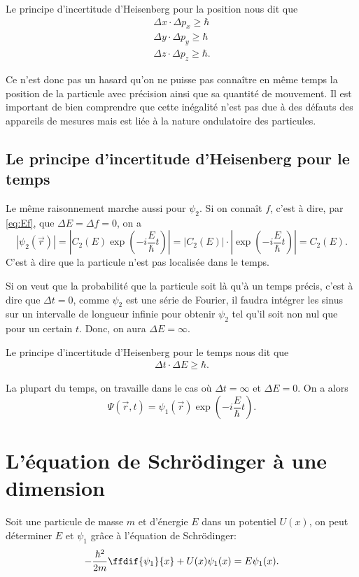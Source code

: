 Le principe d'incertitude d'Heisenberg pour la position nous dit que
\begin{align*}
  \Delta x \cdot \Delta p_x \geq \hbar\\
  \Delta y \cdot \Delta p_y \geq \hbar\\
  \Delta z \cdot \Delta p_z \geq \hbar.
\end{align*}

Ce n'est donc pas un hasard qu'on ne puisse pas connaître en même temps
la position de la particule avec précision ainsi que sa quantité de mouvement.
Il est important de bien comprendre que cette inégalité n'est pas due
à des défauts des appareils de mesures mais est liée à la nature
ondulatoire des particules.

\subsection{Le principe d'incertitude d'Heisenberg pour le temps}
Le même raisonnement marche aussi pour $\psi_2$.
Si on connaît $f$, c'est à dire, par \eqref{eq:Ef},
que $\Delta E = \Delta f = 0$, on a
\[ |\psi_2(\vec{r})|
= \left|C_2(E) \exp\left(-i\frac{E}{\hbar}t\right)\right|
= \left|C_2(E)\right|\cdot\left|\exp\left(-i\frac{E}{\hbar}t\right)\right|
= C_2(E). \]
C'est à dire que la particule n'est pas localisée dans le temps.

Si on veut que la probabilité que la particule soit là qu'à un temps précis,
c'est à dire que $\Delta t = 0$,
comme $\psi_2$ est une série de Fourier, il faudra intégrer les sinus
sur un intervalle de longueur infinie
pour obtenir $\psi_2$ tel qu'il soit non nul que pour un certain $t$.
Donc, on aura $\Delta E = \infty$.

Le principe d'incertitude d'Heisenberg pour le temps nous dit que
\begin{align*}
  \Delta t \cdot \Delta E \geq \hbar.
\end{align*}

La plupart du temps, on travaille dans le cas où
$\Delta t = \infty$ et $\Delta E = 0$.
On a alors
\[ \Psi(\vec{r}, t) = \psi_1(\vec{r}) \exp\left(-i\frac{E}{\hbar}t\right). \]

\section{L'équation de Schrödinger à une dimension}
Soit une particule de masse $m$ et d'énergie $E$ dans un potentiel $U(x)$,
on peut déterminer $E$ et $\psi_1$ grâce à l'équation de Schrödinger:
\[ -\frac{\hbar^2}{2m}\ffdif{\psi_1}{x} + U(x) \psi_1(x) = E\psi_1(x). \]

